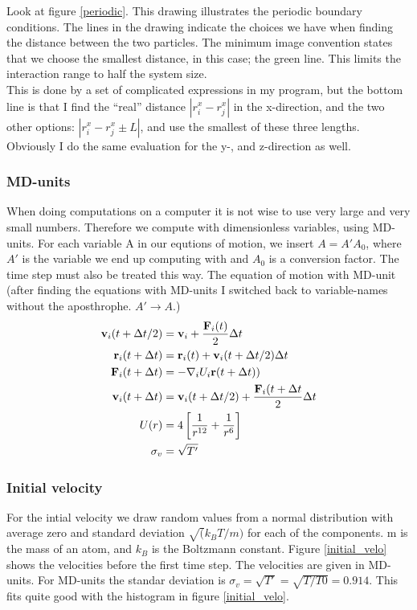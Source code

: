 Look at figure \ref{periodic}. This drawing illustrates the periodic boundary conditions. The lines in the drawing indicate the choices we have when finding the distance between the two particles. The minimum image convention states that we
choose the smallest distance, in this case; the green line. This limits the interaction range to half the system size.\\
This is done by a set of complicated expressions in my program, but the bottom line is that I find the ``real'' distance $|r_i^x -r_j^x|$ in the x-direction, and the two other options: $|r_i^x - r_j^x \pm L|$, and use the smallest of these three lengths. 
Obviously I do the same evaluation for the y-, and z-direction as well. 

\subsubsection{MD-units}
When doing computations on a computer it is not wise to use very large and very small numbers. Therefore we compute with dimensionless variables, using MD-units. For each variable A in our equtions of motion, we insert $A = A'A_0$, where $A'$
is the variable we end up computing with and $A_0$ is a conversion factor. The time step must also be treated this way. The equation of motion with MD-unit (after finding the equations with MD-units I switched back to variable-names without the aposthrophe. $A'\rightarrow A$.)
\begin{align}
 {\bf v}_i(t + \Delta t/2) &= {\bf v}_i + \frac{{\bf F}_i(t)}{2}\Delta t\nonumber\\
 {\bf r}_i(t + \Delta t) &= {\bf r}_i(t) + {\bf v}_i(t + \Delta t/2)\Delta t\nonumber\\
 {\bf F}_i(t + \Delta t) &= -\nabla_i U_i{\bf r}(t+\Delta t))\nonumber\\
 {\bf v}_i(t + \Delta t) &= {\bf v}_i(t+ \Delta t/2) + \frac{{\bf F}_i(t+\Delta t}{2}\Delta t\nonumber\\
 U(r) &= 4\left[\frac{1}{r^{12}} + \frac{1}{r^6}\right]\nonumber\\
 \sigma_v &= \sqrt{T'}
\end{align}

\subsubsection{Initial velocity}
For the intial velocity we draw random values from a normal distribution with average zero and standard deviation $\sqrt(k_B T/m)$ for each of the components. m is the mass of an atom, and $k_B$ is the Boltzmann constant. Figure \ref{initial_velo} shows the velocities 
before the first time step. The velocities are given in MD-units. For MD-units the standar deviation is $\sigma_v = \sqrt{T'} = \sqrt{T/T0} = 0.914$. This fits quite good with the histogram in figure \ref{initial_velo}.

